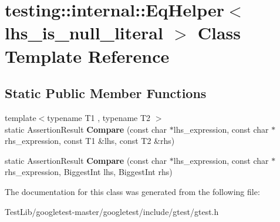 \hypertarget{classtesting_1_1internal_1_1EqHelper}{}\section{testing\+:\+:internal\+:\+:Eq\+Helper$<$ lhs\+\_\+is\+\_\+null\+\_\+literal $>$ Class Template Reference}
\label{classtesting_1_1internal_1_1EqHelper}
\subsection*{Static Public Member Functions}
\begin{DoxyCompactItemize}
\item 
\mbox{\label{classtesting_1_1internal_1_1EqHelper_ae3572c7374534a916b9117efaa89f33f}} 
{\footnotesize template$<$typename T1 , typename T2 $>$ }\\static Assertion\+Result {\bfseries Compare} (const char $\ast$lhs\+\_\+expression, const char $\ast$rhs\+\_\+expression, const T1 \&lhs, const T2 \&rhs)
\item 
\mbox{\label{classtesting_1_1internal_1_1EqHelper_aaa42c0059bb3dcc43d556243febb5f1c}} 
static Assertion\+Result {\bfseries Compare} (const char $\ast$lhs\+\_\+expression, const char $\ast$rhs\+\_\+expression, Biggest\+Int lhs, Biggest\+Int rhs)
\end{DoxyCompactItemize}


The documentation for this class was generated from the following file\+:\begin{DoxyCompactItemize}
\item 
Test\+Lib/googletest-\/master/googletest/include/gtest/gtest.\+h\end{DoxyCompactItemize}
